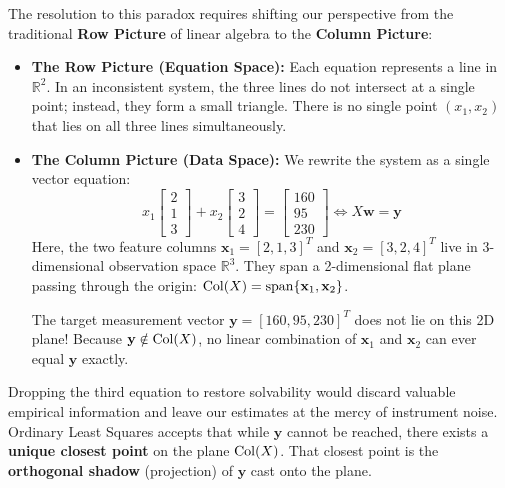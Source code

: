 The resolution to this paradox requires shifting our perspective from the traditional \textbf{Row Picture} of linear algebra to the \textbf{Column Picture}:
\begin{itemize}
    \item \textbf{The Row Picture (Equation Space):} Each equation represents a line in $\mathbb{R}^2$. In an inconsistent system, the three lines do not intersect at a single point; instead, they form a small triangle. There is no single point $(x_1, x_2)$ that lies on all three lines simultaneously.
    \item \textbf{The Column Picture (Data Space):} We rewrite the system as a single vector equation:
    \begin{equation}
    x_1 \begin{bmatrix} 2 \\ 1 \\ 3 \end{bmatrix} + x_2 \begin{bmatrix} 3 \\ 2 \\ 4 \end{bmatrix} = \begin{bmatrix} 160 \\ 95 \\ 230 \end{bmatrix} \iff X\mathbf{w} = \mathbf{y}
    \end{equation}
    Here, the two feature columns $\mathbf{x}_1 = [2, 1, 3]^T$ and $\mathbf{x}_2 = [3, 2, 4]^T$ live in 3-dimensional observation space $\mathbb{R}^3$. They span a 2-dimensional flat plane passing through the origin: $\operatorname{Col}(X) = \operatorname{span}\{\mathbf{x}_1, \mathbf{x}_2\}$.
    
    The target measurement vector $\mathbf{y} = [160, 95, 230]^T$ does not lie on this 2D plane! Because $\mathbf{y} \notin \operatorname{Col}(X)$, no linear combination of $\mathbf{x}_1$ and $\mathbf{x}_2$ can ever equal $\mathbf{y}$ exactly.
\end{itemize}

Dropping the third equation to restore solvability would discard valuable empirical information and leave our estimates at the mercy of instrument noise. Ordinary Least Squares accepts that while $\mathbf{y}$ cannot be reached, there exists a \textbf{unique closest point} on the plane $\operatorname{Col}(X)$. That closest point is the \textbf{orthogonal shadow} (projection) of $\mathbf{y}$ cast onto the plane.

